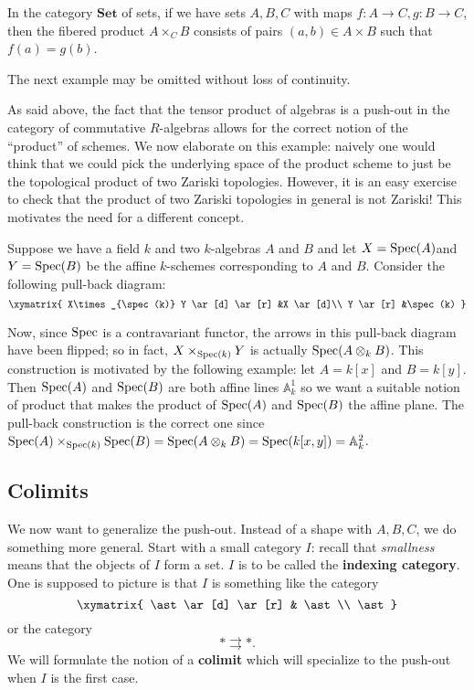 \begin{example} 
In the category $\mathbf{Set}$ of sets, if we have sets $A, B, C$ with maps $f:
A \to C, g: B \to C$, then the fibered product $A \times_C B$ consists of
pairs $(a,b) \in A \times B$ such that $f(a) = g(b)$.  
\end{example} 

\begin{example} The next example may
be omitted without loss of continuity.

As said above, the fact that the tensor product of algebras is
a push-out in the category of
commutative $R$-algebras allows for the correct notion of the ``product'' of
schemes. We now elaborate on this example: naively one would think that we
could pick the underlying space of the product scheme to just be the topological
product of two Zariski topologies. However, it is an easy exercise to check
that the product of two Zariski topologies in general is not Zariski! This
motivates
the need for a different concept.

Suppose we have a field $k$ and two $k$-algebras $A$ and $B$ and let
$X=\operatorname{Spec}(A)$and $Y=\operatorname{Spec}(B)$ be the affine $k$-schemes corresponding to $A$ and
$B$. Consider the following pull-back diagram:
\[
\xymatrix{
X\times_{\spec(k)} Y \ar[d] \ar[r] &X \ar[d]\\
Y \ar[r] &\spec(k) }\]

Now, since $\operatorname{Spec}$ is a contravariant functor, the arrows in this pull-back
diagram have been flipped; so in fact, $X\times_{\operatorname{Spec}(k)} Y$ is actually
$\operatorname{Spec}(A\otimes _k B)$. This construction is motivated by the following example:
let $A=k[x]$ and $B=k[y]$. Then $\operatorname{Spec}(A)$ and $\operatorname{Spec}(B)$ are both affine lines
$\mathbb{A}^1_k$ so we want a suitable notion of product that makes the product
of $\operatorname{Spec}(A)$ and $\operatorname{Spec}(B)$ the affine plane. The pull-back construction is the
correct one since $\operatorname{Spec}(A)\times_{\operatorname{Spec}(k)} \operatorname{Spec}(B)=\operatorname{Spec}(A\otimes_k
B)=\operatorname{Spec}(k[x,y])=\mathbb{A}^2_k$.
\end{example}


\subsection{Colimits}


We now want to generalize the push-out.
Instead of a shape with $A,B,C$, we do something more general.
Start with a small category $I$: recall that \emph{smallness} means that the objects of $I$
form a set. $I$ is to be called  the  \textbf{indexing
category}. One is supposed to picture
is that $I$ is something like the category
\[
\xymatrix{
\ast \ar[d] \ar[r] &  \ast \\
\ast
}
\]
or the category
\[ \ast \rightrightarrows \ast.  \]
We will formulate the notion of a \textbf{colimit} which will specialize to the
push-out when $I$ is the first case. 


